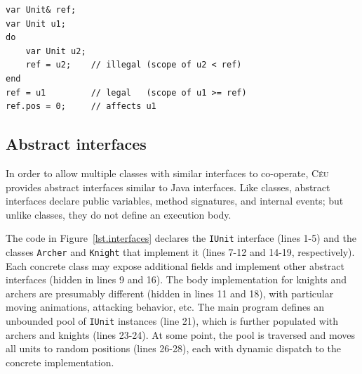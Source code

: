 \documentclass{sigplanconf}
\newcommand{\CEU}{\textsc{C\'{e}u}\xspace}
\newcommand{\code}[1] {{\small{\texttt{#1}}}}
\newcommand{\1}{\;}
\newcommand{\2}{\;\;}
\newcommand{\3}{\;\;\;}
\newcommand{\5}{\;\;\;\;\;}
\begin{document}
\begin{lstlisting}
var Unit& ref;
var Unit u1;
do
    var Unit u2;
    ref = u2;    // illegal (scope of u2 < ref)
end
ref = u1         // legal   (scope of u1 >= ref)
ref.pos = 0;     // affects u1
\end{lstlisting}

\subsection{Abstract interfaces}

In order to allow multiple classes with similar interfaces to co-operate, \CEU 
provides abstract interfaces similar to Java interfaces.
%
Like classes, abstract interfaces declare public variables, method signatures, 
and internal events; but unlike classes, they do not define an execution body.

The code in Figure~\ref{lst.interfaces} declares the \code{IUnit} interface 
(lines 1-5) and the classes \code{Archer} and \code{Knight} that implement it 
(lines 7-12 and 14-19, respectively).
%
Each concrete class may expose additional fields and implement other abstract 
interfaces (hidden in lines 9 and 16).
%
The body implementation for knights and archers are presumably different 
(hidden in lines 11 and 18), with particular moving animations, attacking 
behavior, etc.
%
The main program defines an unbounded pool of \code{IUnit} instances (line 21), 
which is further populated with archers and knights (lines 23-24).
At some point, the pool is traversed and moves all units to random positions 
(lines 26-28), each with dynamic dispatch to the concrete implementation.
\end{document}
